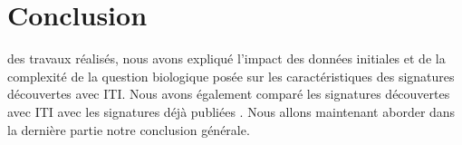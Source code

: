 	\section{\textcolor{blue!45!black}{Conclusion}}
		 des travaux réalisés, nous avons expliqué l'impact des données initiales et de la complexité de la question biologique posée sur les caractéristiques des signatures découvertes avec ITI.
		Nous avons également comparé les signatures découvertes avec ITI avec les signatures déjà publiées \citep{vandevijver2002,Wang2005, Sotiriou2006}.
		Nous allons maintenant aborder dans la dernière partie notre conclusion générale.